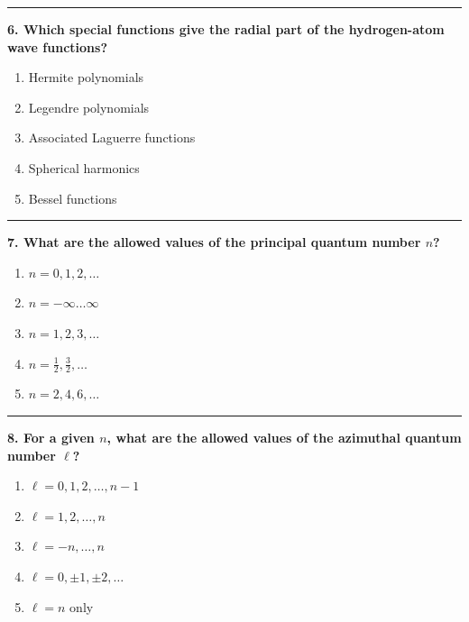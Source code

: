 \documentclass[
  english,
  9pt,
]{extbook}
\providecommand{\tightlist}{%
  \setlength{\itemsep}{0pt}\setlength{\parskip}{0pt}}
\theoremstyle{definition}
\theoremstyle{definition}
\theoremstyle{definition}
\theoremstyle{definition}
\theoremstyle{remark}
\begin{document}
\begin{center}\rule{0.5\linewidth}{0.5pt}\end{center}

\textbf{6. Which special functions give the radial part of the hydrogen-atom wave functions?}

\begin{enumerate}
\def\labelenumi{\alph{enumi}.}
\tightlist
\item
  Hermite polynomials\\
\item
  Legendre polynomials\\
\item
  Associated Laguerre functions\\
\item
  Spherical harmonics\\
\item
  Bessel functions
\end{enumerate}

\begin{center}\rule{0.5\linewidth}{0.5pt}\end{center}

\textbf{7. What are the allowed values of the principal quantum number \(n\)?}

\begin{enumerate}
\def\labelenumi{\alph{enumi}.}
\tightlist
\item
  \(n = 0, 1, 2, \dots\)\\
\item
  \(n = -\infty \dots \infty\)\\
\item
  \(n = 1, 2, 3, \dots\)\\
\item
  \(n = \tfrac{1}{2}, \tfrac{3}{2}, \dots\)\\
\item
  \(n = 2, 4, 6, \dots\)
\end{enumerate}

\begin{center}\rule{0.5\linewidth}{0.5pt}\end{center}

\textbf{8. For a given \(n\), what are the allowed values of the azimuthal quantum number \(\ell\)?}

\begin{enumerate}
\def\labelenumi{\alph{enumi}.}
\tightlist
\item
  \(\ell = 0,1,2,\dots,n-1\)\\
\item
  \(\ell = 1,2,\dots,n\)\\
\item
  \(\ell = -n,\dots,n\)\\
\item
  \(\ell = 0,\pm1,\pm2,\dots\)\\
\item
  \(\ell = n\) only
\end{enumerate}
\end{document}
